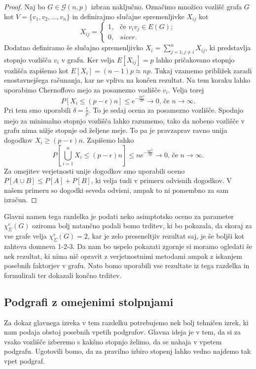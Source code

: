 \documentclass[12pt,a4paper,twoside]{article}
\theoremstyle{definition} %
\theoremstyle{plain} %
\newcommand{\ec}{\chi_{\Sigma}^e}
\numberwithin{equation}{section}  %
\begin{document}
\begin{proof}
Naj bo  $G \in \mathcal{G}(n, p)$ izbran naključno. Označimo množico vozlišč grafa $G$ kot $V = \{v_1, v_2, \ldots, v_n\}$ in definirajmo slučajne spremenljivke $X_{ij}$ kot
$$ X_{ij} =
\begin{cases}
1, & \text{če } v_iv_j \in E(G); \\
0, & sicer.
\end{cases}$$
Dodatno definiramo še slučajno spremenljivko $X_i = \sum_{j=1; j\neq i}^n X_{ij}$, ki predstavlja stopnjo vozlišča $v_i$ v grafu. Ker velja $E[X_{ij}] = p$ lahko pričakovano stopnjo vozlišča zapišemo kot $E[X_i] = (n-1)p \approx np$. Tukaj vzamemo približek zaradi enostavnejšega računanja, kar ne vpliva na končen rezultat. Na tem koraku lahko uporabimo Chernoffovo mejo za posamezno vozlišče $v_i$. Velja torej
$$
P[X_i \le (p - \epsilon)n]  \le e^{-\frac{n \epsilon^2}{2p}} \to 0 \text{, če } n \to \infty.
$$
Pri tem smo uporabili $\delta =  \frac{\epsilon}{p}$. To je sedaj ocena za posamezno vozlišče. Spodnjo mejo za minimalno stopnjo vozlišča lahko razumemo, tako da nobeno vozlišče v grafu nima nižje stopnje od željene meje. To pa je pravzaprav ravno unija dogodkov $X_i \ge (p- \epsilon)n$. Zapišemo lahko 
$$ P\left[\bigcup_{i=1}^n X_i \le (p -\epsilon)n \right] \le ne^{-\frac{n \epsilon^2}{2p}} \to 0 \text{, če } n \to \infty. $$
Za omejitev verjetnosti unije dogodkov smo uporabili oceno $P[A \cup B] \le P[A] + P[B]$, ki velja tudi v primeru odvisnih dogodkov. V našem primeru so dogodki seveda odvisni, ampak to ni pomembno za sam izračun. 
\end{proof}
Glavni namen tega razdelka je podati neko asimptotsko oceno za parameter $\ec(G)$ oziroma bolj natančno podali bomo trditev, ki bo pokazala, da skoraj za vse grafe velja $\ec(G) = 2$, kar je zelo preseneltjiv rezultat saj, je še boljši kot zahteva domneva 1-2-3. Da nam bo uspelo pokazati zgornje si moramo ogledati še nek rezultat, ki nima nič opravit z verjetnostnimi metodami ampak z iskanjem posebnih faktorjev v grafu. Nato bomo uporabili vse rezultate iz tega razdelka in formulirali ter dokazali končno trditev.

\subsection{Podgrafi z omejenimi stolpnjami}
Za dokaz glavnega izreka v tem razdelku potrebujemo nek bolj tehničen izrek, ki nam podaja obstoj posebnih vpetih podgrafov. Glavna ideja je v tem, da si za vsako vozlišče izberemo s kakšno stopnjo želimo, da se nahaja v vpetem podgrafu. Ugotovili bomo, da za pravilno izbiro stopenj lahko vedno najdemo tak vpet podgraf.
\end{document}
